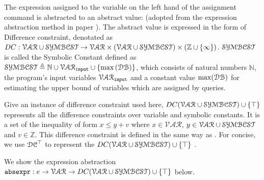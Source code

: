 The expression assigned to the variable on the left hand of the assignment command is abstracted to an abstract value: (adopted from the expression abstraction method in paper \cite{sinn2017complexity}). The abstract value is expressed in the form of Difference constraint, denotated as $DC : \mathcal{VAR} \cup \mathcal{SYMBCST} \to \mathcal{\mathcal{VAR} \times (\mathcal{VAR} \cup \mathcal{SYMBCST}) } \times (\mathbb{Z} \cup \{\infty\})$.  $\mathcal{SYMBCST}$ is called the Symbolic Constant defined as $\mathcal{SYMBCST} \triangleq \mathbb{N} \cup \mathcal{VAR}_{\mathtt{input}} \cup \{\max{(\mathcal{DB})}\} $, which consists of 
natural numbers $\mathbb{N}$,
the program's input variables $\mathcal{VAR}_{\mathtt{input}}$  
and a constant value $\max(\mathcal{DB})$ for estimating the upper bound of variables which are
assigned by queries. 

Give an instance of difference constraint used here,
$DC(\mathcal{VAR}  \cup \mathcal{SYMBCST}) \cup \{\top\}$ represents all the difference constraints over 
variable and symbolic constants. 
It is a set of the inequality of form $x \leq y + v$ where $x \in \mathcal{VAR} $, 
$y \in \mathcal{VAR}  \cup \mathcal{SYMBCST}$ and $v \in \mathbb{Z}$. 
This difference constraint is defined in the same way as
\cite{sinn2017complexity}. For concise, we use $\mathcal{DC}^{\top}$ to represent the $DC(\mathcal{VAR}  \cup \mathcal{SYMBCST}) \cup \{\top\}$ .


We show the expression abstraction $\mathtt{abs}{\mathtt{expr}} : e \to \mathcal{VAR} \to DC(\mathcal{VAR}  \cup \mathcal{SYMBCST}) \cup \{\top\} $ below.




